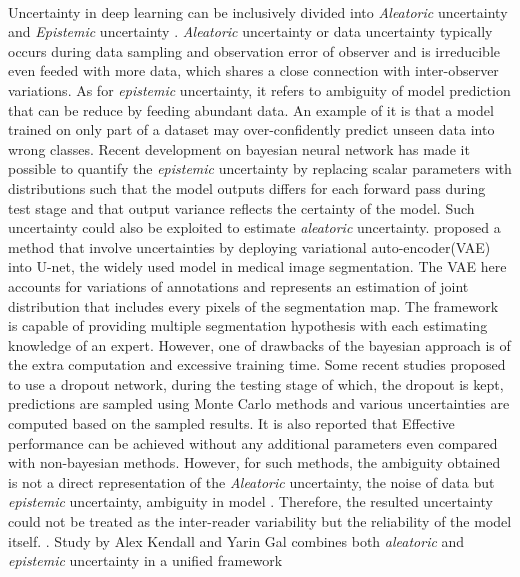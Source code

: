 \documentclass[12pt]{extarticle}
\begin{document}
\paragraph{}
Uncertainty in deep learning can be inclusively divided into \textit{Aleatoric}
uncertainty and \textit{Epistemic} uncertainty \cite{kendall2017uncertainties}.
\textit{Aleatoric} uncertainty or data uncertainty typically occurs during data sampling and
observation error of observer and is irreducible even feeded with more data, which shares a
close connection with inter-observer variations. As for \textit{epistemic}
uncertainty, it refers to ambiguity of model prediction that can be reduce by feeding abundant data.
An example of it is that a model trained on only part of a dataset may over-confidently
predict unseen data into wrong classes. Recent development on bayesian neural network has made it possible
to quantify the \textit{epistemic} uncertainty by replacing scalar parameters with distributions such that 
the model outputs differs for each forward pass during test stage and that output variance reflects the 
certainty of the model. Such uncertainty could also be exploited to estimate \textit{aleatoric} uncertainty.
\cite{kohl2019probabilistic} proposed a method that involve uncertainties by
deploying variational auto-encoder(VAE) into U-net, the widely used model in medical image segmentation. 
The VAE here accounts for variations of annotations and represents an estimation of joint distribution that 
includes every pixels of the segmentation map. The framework is capable of providing multiple segmentation 
hypothesis with each estimating knowledge of an expert.
However, one of drawbacks of the bayesian approach is of the extra computation
and excessive training time. Some recent studies proposed to use a dropout network,
during the testing stage of which, the dropout is kept, predictions are sampled
using Monte Carlo methods and various uncertainties are computed based on the sampled results.
It is also reported that Effective performance can be achieved without any additional parameters even 
compared with non-bayesian methods. However, for such methods, the ambiguity obtained is
not a direct representation of the \textit{Aleatoric} uncertainty,
the noise of data but \textit{epistemic} uncertainty, ambiguity in model
\cite{kendall2017uncertainties}. Therefore, the resulted uncertainty could not
be treated as the inter-reader variability but the reliability of the model itself.
\cite{nair2018exploring}. Study by Alex Kendall and Yarin Gal \cite{kendall2017uncertainties} 
combines both \textit{aleatoric} and \textit{epistemic} uncertainty in a unified framework 
\end{document}
